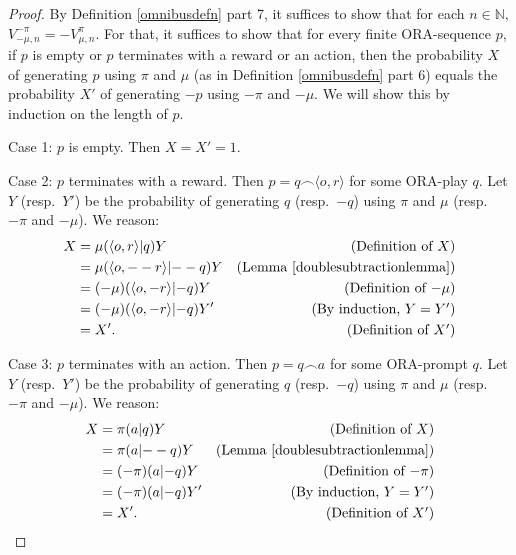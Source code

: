 \documentclass{article}
\begin{document}
\begin{proof}
    By Definition \ref{omnibusdefn} part 7,
    it suffices to show that for each $n\in\mathbb N$,
    $V^{-\pi}_{-\mu,n}=-V^\pi_{\mu,n}$.
    For that, it suffices to show that for every finite ORA-sequence
    $p$, if $p$ is empty or $p$ terminates with a reward or an action, then
    the probability $X$ of generating $p$ using $\pi$ and $\mu$
    (as in Definition \ref{omnibusdefn} part 6)
    equals the probability $X'$ of generating $-p$
    using $-\pi$ and $-\mu$. We will show this by induction on the length of $p$.

    Case 1: $p$ is empty. Then $X=X'=1$.

    Case 2: $p$ terminates with a reward.
    Then $p=q\frown \langle o,r\rangle$
    for some ORA-play $q$. Let $Y$ (resp.\ $Y'$) be the probability of generating $q$
    (resp.\ $-q$)
    using $\pi$ and $\mu$ (resp.\ $-\pi$ and $-\mu$). We reason:
    \begin{align*}
        X &= \mu(\langle o,r\rangle|q)Y
            &\mbox{(Definition of $X$)}\\
          &= \mu(\langle o,--r\rangle | {--q})Y
            &\mbox{(Lemma \ref{doublesubtractionlemma})}\\
          &= (-\mu)(\langle o,-r\rangle | {-q})Y
            &\mbox{(Definition of $-\mu$)}\\
          &= (-\mu)(\langle o,-r\rangle | {-q})Y'
            &\mbox{(By induction, $Y=Y'$)}\\
          &= X'. &\mbox{(Definition of $X'$)}
    \end{align*}

    Case 3: $p$ terminates with an action.
    Then $p=q\frown a$ for some ORA-prompt $q$.
    Let $Y$ (resp.\ $Y'$) be the probability of generating $q$
    (resp.\ $-q$)
    using $\pi$ and $\mu$ (resp.\ $-\pi$ and $-\mu$). We reason:
    \begin{align*}
        X &= \pi(a|q)Y
            &\mbox{(Definition of $X$)}\\
          &= \pi(a|{--q})Y
            &\mbox{(Lemma \ref{doublesubtractionlemma})}\\
          &= (-\pi)(a|{-q})Y
            &\mbox{(Definition of $-\pi$)}\\
          &= (-\pi)(a|{-q})Y'
            &\mbox{(By induction, $Y=Y'$)}\\
          &= X'. &\mbox{(Definition of $X'$)}
    \end{align*}
\end{proof}
\end{document}
